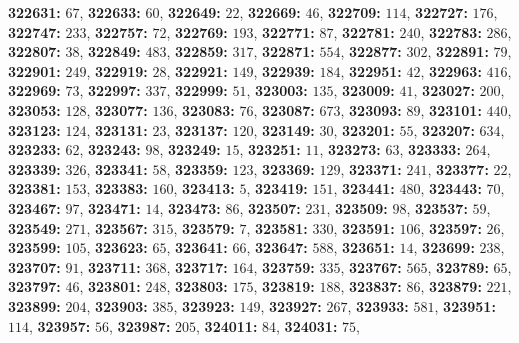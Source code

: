 \textsf{\bfseries 322631:} $67$, \textsf{\bfseries 322633:} $60$, \textsf{\bfseries 322649:} $22$, \textsf{\bfseries 322669:} $46$, \textsf{\bfseries 322709:} $114$, \textsf{\bfseries 322727:} $176$, \textsf{\bfseries 322747:} $233$, \textsf{\bfseries 322757:} $72$, \textsf{\bfseries 322769:} $193$, \textsf{\bfseries 322771:} $87$, \textsf{\bfseries 322781:} $240$, \textsf{\bfseries 322783:} $286$, \textsf{\bfseries 322807:} $38$, \textsf{\bfseries 322849:} $483$, \textsf{\bfseries 322859:} $317$, \textsf{\bfseries 322871:} $554$, \textsf{\bfseries 322877:} $302$, \textsf{\bfseries 322891:} $79$, \textsf{\bfseries 322901:} $249$, \textsf{\bfseries 322919:} $28$, \textsf{\bfseries 322921:} $149$, \textsf{\bfseries 322939:} $184$, \textsf{\bfseries 322951:} $42$, \textsf{\bfseries 322963:} $416$, \textsf{\bfseries 322969:} $73$, \textsf{\bfseries 322997:} $337$, \textsf{\bfseries 322999:} $51$, \textsf{\bfseries 323003:} $135$, \textsf{\bfseries 323009:} $41$, \textsf{\bfseries 323027:} $200$, \textsf{\bfseries 323053:} $128$, \textsf{\bfseries 323077:} $136$, \textsf{\bfseries 323083:} $76$, \textsf{\bfseries 323087:} $673$, \textsf{\bfseries 323093:} $89$, \textsf{\bfseries 323101:} $440$, \textsf{\bfseries 323123:} $124$, \textsf{\bfseries 323131:} $23$, \textsf{\bfseries 323137:} $120$, \textsf{\bfseries 323149:} $30$, \textsf{\bfseries 323201:} $55$, \textsf{\bfseries 323207:} $634$, \textsf{\bfseries 323233:} $62$, \textsf{\bfseries 323243:} $98$, \textsf{\bfseries 323249:} $15$, \textsf{\bfseries 323251:} $11$, \textsf{\bfseries 323273:} $63$, \textsf{\bfseries 323333:} $264$, \textsf{\bfseries 323339:} $326$, \textsf{\bfseries 323341:} $58$, \textsf{\bfseries 323359:} $123$, \textsf{\bfseries 323369:} $129$, \textsf{\bfseries 323371:} $241$, \textsf{\bfseries 323377:} $22$, \textsf{\bfseries 323381:} $153$, \textsf{\bfseries 323383:} $160$, \textsf{\bfseries 323413:} $5$, \textsf{\bfseries 323419:} $151$, \textsf{\bfseries 323441:} $480$, \textsf{\bfseries 323443:} $70$, \textsf{\bfseries 323467:} $97$, \textsf{\bfseries 323471:} $14$, \textsf{\bfseries 323473:} $86$, \textsf{\bfseries 323507:} $231$, \textsf{\bfseries 323509:} $98$, \textsf{\bfseries 323537:} $59$, \textsf{\bfseries 323549:} $271$, \textsf{\bfseries 323567:} $315$, \textsf{\bfseries 323579:} $7$, \textsf{\bfseries 323581:} $330$, \textsf{\bfseries 323591:} $106$, \textsf{\bfseries 323597:} $26$, \textsf{\bfseries 323599:} $105$, \textsf{\bfseries 323623:} $65$, \textsf{\bfseries 323641:} $66$, \textsf{\bfseries 323647:} $588$, \textsf{\bfseries 323651:} $14$, \textsf{\bfseries 323699:} $238$, \textsf{\bfseries 323707:} $91$, \textsf{\bfseries 323711:} $368$, \textsf{\bfseries 323717:} $164$, \textsf{\bfseries 323759:} $335$, \textsf{\bfseries 323767:} $565$, \textsf{\bfseries 323789:} $65$, \textsf{\bfseries 323797:} $46$, \textsf{\bfseries 323801:} $248$, \textsf{\bfseries 323803:} $175$, \textsf{\bfseries 323819:} $188$, \textsf{\bfseries 323837:} $86$, \textsf{\bfseries 323879:} $221$, \textsf{\bfseries 323899:} $204$, \textsf{\bfseries 323903:} $385$, \textsf{\bfseries 323923:} $149$, \textsf{\bfseries 323927:} $267$, \textsf{\bfseries 323933:} $581$, \textsf{\bfseries 323951:} $114$, \textsf{\bfseries 323957:} $56$, \textsf{\bfseries 323987:} $205$, \textsf{\bfseries 324011:} $84$, \textsf{\bfseries 324031:} $75$, 
